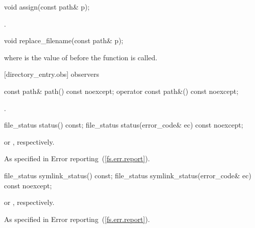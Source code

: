 %
\begin{itemdecl}
void assign(const path& p);
\end{itemdecl}

\begin{itemdescr}
\pnum
\postcondition {}.
\end{itemdescr}

%
\begin{itemdecl}
void replace_filename(const path& p);
\end{itemdecl}

\begin{itemdescr}
\pnum
\postcondition {} where
   is the value of  before the function is
  called.
\end{itemdescr}

[directory_entry.obs]{ observers}

%
%
\begin{itemdecl}
const path& path() const noexcept;
operator const path&() const noexcept;
\end{itemdecl}

\begin{itemdescr}
\pnum
\returns {}.
\end{itemdescr}

%
\begin{itemdecl}
file_status status() const;
file_status status(error_code& ec) const noexcept;
\end{itemdecl}

\begin{itemdescr}
\pnum
\returns {} or , respectively.

\pnum
\throws As specified in Error reporting~(\ref{fs.err.report}).
\end{itemdescr}

%
\begin{itemdecl}
file_status symlink_status() const;
file_status symlink_status(error_code& ec) const noexcept;
\end{itemdecl}

\begin{itemdescr}
\pnum
\returns {} or , respectively.

\pnum
\throws As specified in Error reporting~(\ref{fs.err.report}).
\end{itemdescr}

